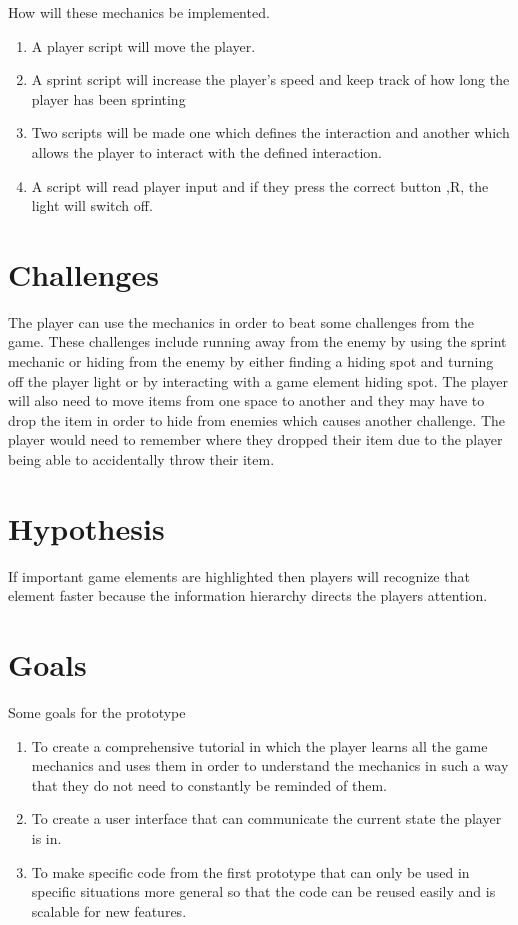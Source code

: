 \documentclass{article}
\begin{document}
How will these mechanics be implemented.
\begin{enumerate}
    \item A player script will move the player.
    \item A sprint script will increase the player's speed and keep track of 
    how long the player has been sprinting 
    \item Two scripts will be made one which defines the interaction and another
    which allows the player to interact with the defined interaction.
    \item A script will read player input and if they press the correct button ,R,
    the light will switch off.
\end{enumerate}

\section{Challenges}
The player can use the mechanics in order to beat some challenges from the game.
These challenges include running away from the enemy by using the sprint mechanic
or hiding from the enemy by either finding a hiding spot and turning off the player
light or by interacting with a game element hiding spot. The player will also need
to move items from one space to another and they may have to drop the item in order
to hide from enemies which causes another challenge. The player would need to remember where they
dropped their item due to the player being able to accidentally throw their item.



\section{Hypothesis}
If important game elements are highlighted
then players will recognize that element faster
because the information hierarchy directs the players attention.



\section{Goals}
Some goals for the prototype
\begin{enumerate}
    \item To create a comprehensive tutorial in which the player learns all 
    the game mechanics and uses them in order to understand the mechanics in 
    such a way that they do not need to constantly be reminded of them.
    \item To create a user interface that can communicate the current state
    the player is in.
    \item To make specific code from the first prototype that can only be used
    in specific situations more general so that the code can be reused easily 
    and is scalable for new features.
\end{enumerate}
\end{document}
